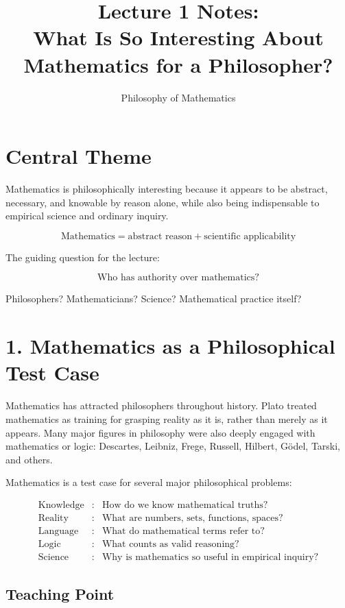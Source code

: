 \documentclass[11pt]{article}
\title{Lecture 1 Notes: \\ What Is So Interesting About Mathematics for a Philosopher?}
\author{Philosophy of Mathematics}
\date{}
\begin{document}
\maketitle

\section*{Central Theme}

Mathematics is philosophically interesting because it appears to be abstract, necessary,
and knowable by reason alone, while also being indispensable to empirical science and
ordinary inquiry.

\[
\text{Mathematics} = \text{abstract reason} + \text{scientific applicability}
\]

The guiding question for the lecture:

\[
\boxed{\text{Who has authority over mathematics?}}
\]

Philosophers? Mathematicians? Science? Mathematical practice itself?

\section*{1. Mathematics as a Philosophical Test Case}

Mathematics has attracted philosophers throughout history. Plato treated mathematics as
training for grasping reality as it is, rather than merely as it appears. Many major figures
in philosophy were also deeply engaged with mathematics or logic: Descartes, Leibniz,
Frege, Russell, Hilbert, G\"odel, Tarski, and others.

Mathematics is a test case for several major philosophical problems:

\[
\begin{array}{rcl}
\text{Knowledge} &:& \text{How do we know mathematical truths?} \\
\text{Reality} &:& \text{What are numbers, sets, functions, spaces?} \\
\text{Language} &:& \text{What do mathematical terms refer to?} \\
\text{Logic} &:& \text{What counts as valid reasoning?} \\
\text{Science} &:& \text{Why is mathematics so useful in empirical inquiry?}
\end{array}
\]

\subsection*{Teaching Point}
\end{document}
